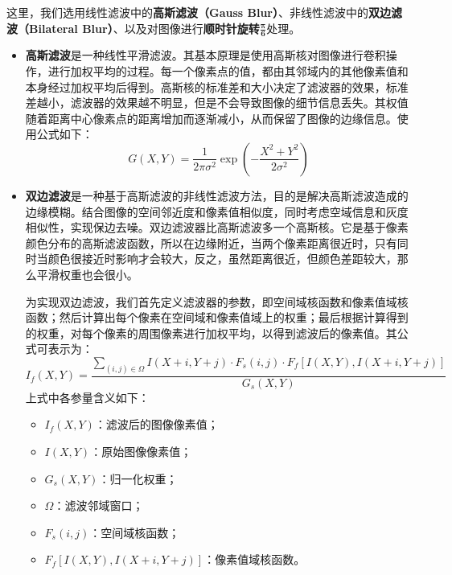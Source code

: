 \documentclass{MathorCupmodeling}
\begin{document}
	这里，我们选用线性滤波中的\textbf{高斯滤波（Gauss Blur）}、非线性滤波中的\textbf{双边滤波（Bilateral Blur）}、以及对图像进行\textbf{顺时针旋转$\boldsymbol{\frac{\pi}{6}}$}处理。
	\begin{itemize}
		\item \textbf{高斯滤波}是一种线性平滑滤波。其基本原理是使用高斯核对图像进行卷积操作，进行加权平均的过程。每一个像素点的值，都由其邻域内的其他像素值和本身经过加权平均后得到。高斯核的标准差和大小决定了滤波器的效果，标准差越小，滤波器的效果越不明显，但是不会导致图像的细节信息丢失。其权值随着距离中心像素点的距离增加而逐渐减小，从而保留了图像的边缘信息。使用公式如下：
		\begin{equation}
			G\left(X,Y\right)=\frac{1}{2\pi\sigma^2}\exp\left(-\frac{X^2+Y^2}{2\sigma^2}\right)
		\end{equation}
		\item \textbf{双边滤波}是一种基于高斯滤波的非线性滤波方法，目的是解决高斯滤波造成的边缘模糊。结合图像的空间邻近度和像素值相似度，同时考虑空域信息和灰度相似性，实现保边去噪。双边滤波器比高斯滤波多一个高斯核。它是基于像素颜色分布的高斯滤波函数，所以在边缘附近，当两个像素距离很近时，只有同时当颜色很接近时影响才会较大，反之，虽然距离很近，但颜色差距较大，那么平滑权重也会很小。
		
		为实现双边滤波，我们首先定义滤波器的参数，即空间域核函数和像素值域核函数；然后计算出每个像素在空间域和像素值域上的权重；最后根据计算得到的权重，对每个像素的周围像素进行加权平均，以得到滤波后的像素值。其公式可表示为：
		\begin{equation}
			I_f\left( X,Y \right) =\frac{\sum_{\left( i,j \right) \in \Omega}{I\left( X+i,Y+j \right) \cdot F_s\left( i,j \right)}\cdot F_f\left[ I\left( X,Y \right) ,I\left( X+i,Y+j \right) \right]}{G_s\left( X,Y \right)} 
		\end{equation}
		上式中各参量含义如下：
		\begin{itemize}
			\item $I_f\left(X,Y\right)$：滤波后的图像像素值；
			\item $I\left(X,Y\right)$：原始图像像素值；
			\item $G_s\left(X,Y\right)$：归一化权重；
			\item $\Omega$：滤波邻域窗口；
			\item $F_s\left(i,j\right)$：空间域核函数；
			\item $F_f\left[ I\left( X,Y \right) ,I\left( X+i,Y+j \right) \right]$：像素值域核函数。
		\end{itemize}
	\end{itemize}
	
\end{document}
